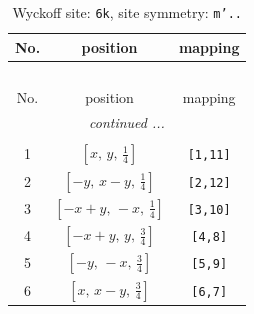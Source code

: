\documentclass[fleqn,8pt]{jsarticle}
\begin{document}
\renewcommand{\arraystretch}{1.2}
\begin{longtable}{ccc}
\caption{Wyckoff site: {\tt 6k}, site symmetry: {\tt m'..}}
 \\
 \hline \hline
No. & position & mapping \\ \hline \endfirsthead

\multicolumn{2}{l}{\tablename\ \thetable{}} \\
 \hline \hline
No. & position & mapping \\ \hline \endhead

 \hline \hline
\multicolumn{2}{r}{\footnotesize\it continued ...} \\ \endfoot

 \hline \hline
\multicolumn{2}{r}{} \\ \endlastfoot

1 & $\left[ x,\, y,\, \frac{1}{4} \right]$ & {\tt [1,11]} \\ \hline
2 & $\left[ - y,\, x - y,\, \frac{1}{4} \right]$ & {\tt [2,12]} \\ \hline
3 & $\left[ - x + y,\, - x,\, \frac{1}{4} \right]$ & {\tt [3,10]} \\ \hline
4 & $\left[ - x + y,\, y,\, \frac{3}{4} \right]$ & {\tt [4,8]} \\ \hline
5 & $\left[ - y,\, - x,\, \frac{3}{4} \right]$ & {\tt [5,9]} \\ \hline
6 & $\left[ x,\, x - y,\, \frac{3}{4} \right]$ & {\tt [6,7]} \\
\end{longtable}
\renewcommand{\arraystretch}{1.2}
\end{document}
